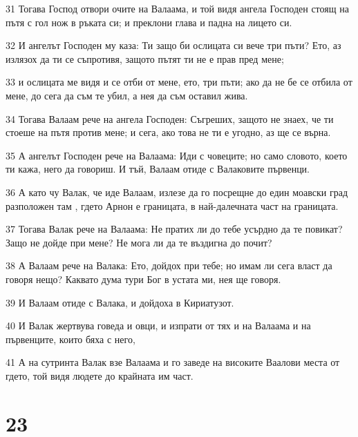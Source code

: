 \par 31 Тогава Господ отвори очите на Валаама, и той видя ангела Господен стоящ на пътя с гол нож в ръката си; и преклони глава и падна на лицето си.
\par 32 И ангелът Господен му каза: Ти защо би ослицата си вече три пъти? Ето, аз излязох да ти се съпротивя, защото пътят ти не е прав пред мене;
\par 33 и ослицата ме видя и се отби от мене, ето, три пъти; ако да не бе се отбила от мене, до сега да съм те убил, а нея да съм оставил жива.
\par 34 Тогава Валаам рече на ангела Господен: Съгреших, защото не знаех, че ти стоеше на пътя против мене; и сега, ако това не ти е угодно, аз ще се върна.
\par 35 А ангелът Господен рече на Валаама: Иди с човеците; но само словото, което ти кажа, него да говориш. И тъй, Валаам отиде с Валаковите първенци.
\par 36 А като чу Валак, че иде Валаам, излезе да го посрещне до един моавски град разположен там , гдето Арнон е границата, в най-далечната част на границата.
\par 37 Тогава Валак рече на Валаама: Не пратих ли до тебе усърдно да те повикат? Защо не дойде при мене? Не мога ли да те въздигна до почит?
\par 38 А Валаам рече на Валака: Ето, дойдох при тебе; но имам ли сега власт да говоря нещо? Каквато дума тури Бог в устата ми, нея ще говоря.
\par 39 И Валаам отиде с Валака, и дойдоха в Кириатузот.
\par 40 И Валак жертвува говеда и овци, и изпрати от тях и на Валаама и на първенците, които бяха с него,
\par 41 А на сутринта Валак взе Валаама и го заведе на високите Ваалови места от гдето, той видя людете до крайната им част.

\chapter{23}

